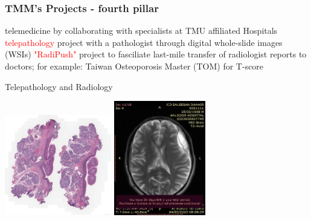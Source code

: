 \documentclass[aspectratio=169]{beamer}
\begin{document}
\begin{frame}
\frametitle{TMM's Projects - fourth pillar}
\begin{outline}    
    \1 telemedicine
        \2 by collaborating with specialists at TMU affiliated Hospitals
        \2 \textcolor{red}{telepathology} project with a pathologist through digital whole-slide images (WSIs)
        \2 \textcolor{red}{"RadiPush"} project to fasciliate last-mile transfer of radiologist reports to doctors; for example: Taiwan Osteoporosis Master (TOM) for T-score
    
\end{outline}
\end{frame}


\begin{frame}{Telepathology and Radiology}
    \begin{center}
        \includegraphics[width=0.35\textwidth]{TH1919729C1_HE.jpeg}
        \includegraphics[width=0.30\textwidth]{IMG-0007-00001.jpg}
    \end{center}
\end{frame}
\end{document}
